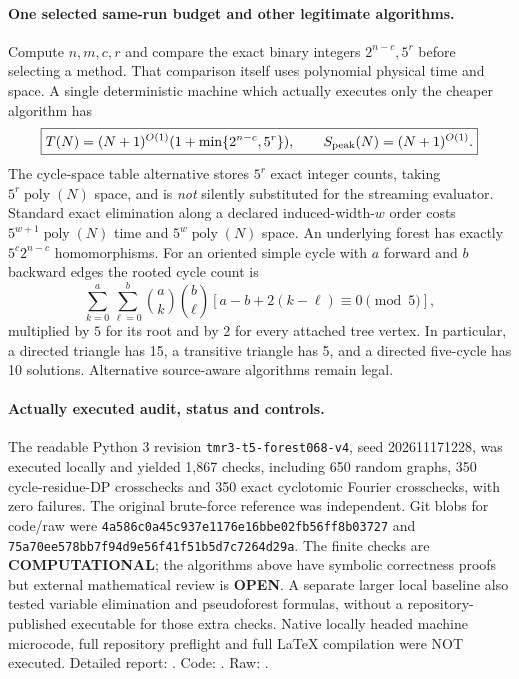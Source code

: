 \documentclass[11pt]{article}
\begin{document}
\paragraph{One selected same-run budget and other legitimate algorithms.}
Compute $n,m,c,r$ and compare the exact binary integers
$2^{n-c},5^r$ before selecting a method. That comparison itself
uses polynomial physical time and space. A single deterministic
machine which actually executes only the cheaper algorithm has
\[
 \boxed{T(N)=(N+1)^{O(1)}
       (1+\min\{2^{n-c},5^r\}),\qquad
       S_{\rm peak}(N)=(N+1)^{O(1)}.}
\]
The cycle-space table alternative stores $5^r$ exact integer counts,
taking $5^r\operatorname{poly}(N)$ space, and is \emph{not} silently
substituted for the streaming evaluator. Standard exact elimination
along a declared induced-width-$w$ order costs
$5^{w+1}\operatorname{poly}(N)$ time and
$5^w\operatorname{poly}(N)$ space.
An underlying forest has exactly $5^c2^{n-c}$ homomorphisms.
For an oriented simple cycle with $a$ forward and $b$ backward
edges the rooted cycle count is
\[
  \sum_{k=0}^a\sum_{\ell=0}^b
  {a\choose k}{b\choose\ell}
  [a-b+2(k-\ell)\equiv0\pmod5],
\]
multiplied by $5$ for its root and by $2$ for every attached
tree vertex. In particular, a directed triangle has 15, a
transitive triangle has 5, and a directed five-cycle has 10
solutions. Alternative source-aware algorithms remain legal.

\paragraph{Actually executed audit, status and controls.}
The readable Python 3 revision \texttt{tmr3-t5-forest068-v4},
seed 202611171228, was executed locally and yielded 1,867
checks, including 650 random graphs, 350 cycle-residue-DP
crosschecks and 350 exact cyclotomic Fourier crosschecks,
with zero failures. The original brute-force reference was
independent. Git blobs for code/raw were
\texttt{4a586c0a45c937e1176e16bbe02fb56ff8b03727}
and \texttt{75a70ee578bb7f94d9e56f41f51b5d7c7264d29a}.
The finite checks are \textbf{COMPUTATIONAL}; the algorithms above
have symbolic correctness proofs but external mathematical review is
\textbf{OPEN}. A separate larger local baseline also tested
variable elimination and pseudoforest formulas, without a
repository-published executable for those extra checks.
Native locally headed machine microcode, full repository preflight
and full LaTeX compilation were NOT executed.
Detailed report:
.
Code:
.
Raw:
.
\end{document}
